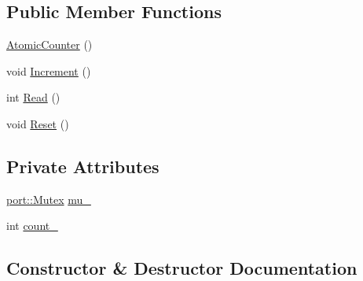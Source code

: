 \subsection*{Public Member Functions}
\begin{DoxyCompactItemize}
\item 
\hyperlink{classleveldb_1_1anonymous__namespace_02db__test_8cc_03_1_1_atomic_counter_a7060eec7314e17897a941cde15bd9aa7}{Atomic\+Counter} ()
\item 
void \hyperlink{classleveldb_1_1anonymous__namespace_02db__test_8cc_03_1_1_atomic_counter_a5ba08e70f6124baad9022b02ad18bcc1}{Increment} ()
\item 
int \hyperlink{classleveldb_1_1anonymous__namespace_02db__test_8cc_03_1_1_atomic_counter_a836093aac3513f1ed27e7f0e0d21b4aa}{Read} ()
\item 
void \hyperlink{classleveldb_1_1anonymous__namespace_02db__test_8cc_03_1_1_atomic_counter_ade5417897aea97174320a2ead2c4d86f}{Reset} ()
\end{DoxyCompactItemize}
\subsection*{Private Attributes}
\begin{DoxyCompactItemize}
\item 
\hyperlink{classleveldb_1_1port_1_1_mutex}{port\+::\+Mutex} \hyperlink{classleveldb_1_1anonymous__namespace_02db__test_8cc_03_1_1_atomic_counter_a4ff92b96ee462ae498f2d2a661e9f806}{mu\+\_\+}
\item 
int \hyperlink{classleveldb_1_1anonymous__namespace_02db__test_8cc_03_1_1_atomic_counter_ac6f3cf697a1b5e480da0f1ac30775bc2}{count\+\_\+}
\end{DoxyCompactItemize}


\subsection{Constructor \& Destructor Documentation}
\hypertarget{classleveldb_1_1anonymous__namespace_02db__test_8cc_03_1_1_atomic_counter_a7060eec7314e17897a941cde15bd9aa7}{}
